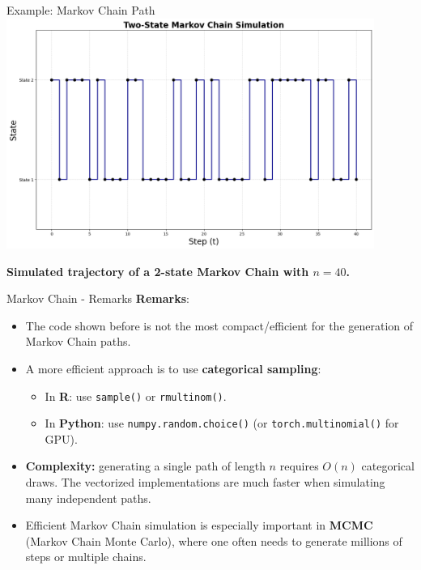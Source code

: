 \documentclass[8pt]{beamer}
\begin{document}
\begin{frame}{Example: Markov Chain Path}
\centering
\includegraphics[width=0.9\textwidth]{chapter2-part2-plot1.png}

\vspace{3mm}
\textbf{Simulated trajectory of a 2-state Markov Chain with $n=40$.}
\end{frame}

\begin{frame}{Markov Chain - Remarks}
\textbf{Remarks}:
\begin{itemize}
    \item The code shown before is not the most compact/efficient for the generation of Markov Chain paths.
    \item A more efficient approach is to use \textbf{categorical sampling}: 
    \begin{itemize}
        \item In \textbf{R}: use \texttt{sample()} or \texttt{rmultinom()}.
        \item In \textbf{Python}: use \texttt{numpy.random.choice()} (or 			 \texttt{torch.multinomial()} for GPU).
    \end{itemize}
    \item \textbf{Complexity:} generating a single path of length $n$ requires $O(n)$ categorical draws. The vectorized implementations are much faster when simulating many independent paths.
    \item Efficient Markov Chain simulation is especially important in \textbf{MCMC} (Markov Chain Monte Carlo), 
    where one often needs to generate millions of steps or multiple chains.
\end{itemize}
\end{frame}
\end{document}
